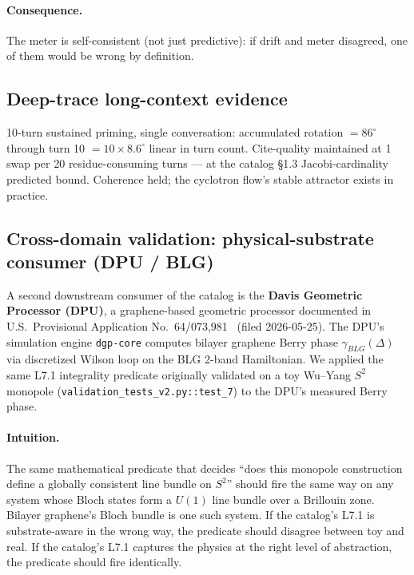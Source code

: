 \documentclass[11pt,letterpaper]{article}
\begin{document}
\paragraph{Consequence.} The meter is self-consistent (not just
predictive): if drift and meter disagreed, one of them would be
wrong by definition.

\subsection{Deep-trace long-context evidence}

10-turn sustained priming, single conversation: accumulated
rotation $= 86^\circ$ through turn 10 $= 10 \times 8.6^\circ$
linear in turn count. Cite-quality maintained at 1 swap per 20
residue-consuming turns --- at the catalog \S1.3 Jacobi-cardinality
predicted bound. Coherence held; the cyclotron flow's stable
attractor exists in practice.

\subsection{Cross-domain validation: physical-substrate consumer (DPU / BLG)}
\label{sec:validation-dpu}

A second downstream consumer of the catalog is the \textbf{Davis
Geometric Processor (DPU)}, a graphene-based geometric processor
documented in U.S.\ Provisional Application
No.~64/073,981~\cite{davis2026dpu} (filed 2026-05-25). The DPU's
simulation engine \texttt{dgp-core} computes bilayer graphene Berry
phase $\gamma_{BLG}(\Delta)$ via discretized Wilson loop on the BLG
2-band Hamiltonian. We applied the same L7.1 integrality predicate
originally validated on a toy Wu--Yang $S^2$ monopole
(\texttt{validation\_tests\_v2.py::test\_7}) to the DPU's measured
Berry phase.

\paragraph{Intuition.}
The same mathematical predicate that decides ``does this monopole
construction define a globally consistent line bundle on $S^2$''
should fire the same way on any system whose Bloch states form a
$U(1)$ line bundle over a Brillouin zone. Bilayer graphene's Bloch
bundle is one such system. If the catalog's L7.1 is substrate-aware
in the wrong way, the predicate should disagree between toy and
real. If the catalog's L7.1 captures the physics at the right level
of abstraction, the predicate should fire identically.
\end{document}
